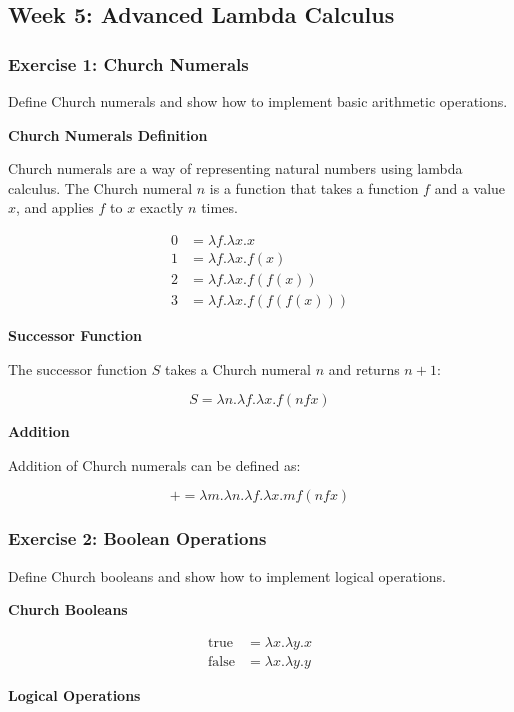 \documentclass{article}
\theoremstyle{plain}
\theoremstyle{definition}
\theoremstyle{remark}
\begin{document}
\subsection{Week 5: Advanced Lambda Calculus}

\subsubsection{Exercise 1: Church Numerals}

Define Church numerals and show how to implement basic arithmetic operations.

\textbf{Church Numerals Definition}

Church numerals are a way of representing natural numbers using lambda calculus. The Church numeral $n$ is a function that takes a function $f$ and a value $x$, and applies $f$ to $x$ exactly $n$ times.

\begin{align}
0 &= \lambda f.\lambda x.x \\
1 &= \lambda f.\lambda x.f(x) \\
2 &= \lambda f.\lambda x.f(f(x)) \\
3 &= \lambda f.\lambda x.f(f(f(x)))
\end{align}

\textbf{Successor Function}

The successor function $S$ takes a Church numeral $n$ and returns $n+1$:

$$S = \lambda n.\lambda f.\lambda x.f(n f x)$$

\textbf{Addition}

Addition of Church numerals can be defined as:

$$+ = \lambda m.\lambda n.\lambda f.\lambda x.m f (n f x)$$

\subsubsection{Exercise 2: Boolean Operations}

Define Church booleans and show how to implement logical operations.

\textbf{Church Booleans}

\begin{align}
\text{true} &= \lambda x.\lambda y.x \\
\text{false} &= \lambda x.\lambda y.y
\end{align}

\textbf{Logical Operations}
\end{document}
